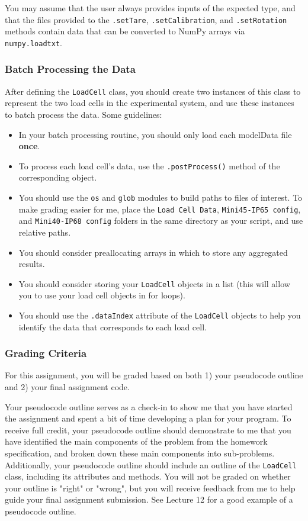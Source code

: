 \documentclass{homework}
\begin{document}
You may assume that the user always provides inputs of the expected type, and that the files provided to the \texttt{.setTare}, \texttt{.setCalibration}, and \texttt{.setRotation} methods contain data that can be converted to NumPy arrays via \texttt{numpy.loadtxt}.

\newpage
\subsubsection*{Batch Processing the Data}

After defining the \texttt{LoadCell} class, you should create two instances of this class to represent the two load cells in the experimental system, and use these instances to batch process the data. Some guidelines:

\begin{itemize}
    \itemsep0em 
    \item In your batch processing routine, you should only load each modelData file \textbf{once}.
    \item To process each load cell's data, use the \texttt{.postProcess()} method of the corresponding object.
    \item You should use the \texttt{os} and \texttt{glob} modules to build paths to files of interest. To make grading easier for me, place the \texttt{Load Cell Data}, \texttt{Mini45-IP65 config}, and \texttt{Mini40-IP68 config} folders in the same directory as your script, and use relative paths.
    \item You should consider preallocating arrays in which to store any aggregated results.
    \item You should consider storing your \texttt{LoadCell} objects in a list (this will allow you to use your load cell objects in for loops).
    \item You should use the \texttt{.dataIndex} attribute of the \texttt{LoadCell} objects to help you identify the data that corresponds to each load cell.
\end{itemize}

\subsubsection*{Grading Criteria}

For this assignment, you will be graded based on both 1) your pseudocode outline and 2) your final assignment code.

Your pseudocode outline serves as a check-in to show me that you have started the assignment and spent a bit of time developing a plan for your program. To receive full credit, your pseudocode outline should demonstrate to me that you have identified the main components of the problem from the homework specification, and broken down these main components into sub-problems. Additionally, your pseudocode outline should include an outline of the \texttt{LoadCell} class, including its attributes and methods. You will not be graded on whether your outline is "right" or "wrong", but you will receive feedback from me to help guide your final assignment submission. See Lecture 12 for a good example of a pseudocode outline.
\end{document}
